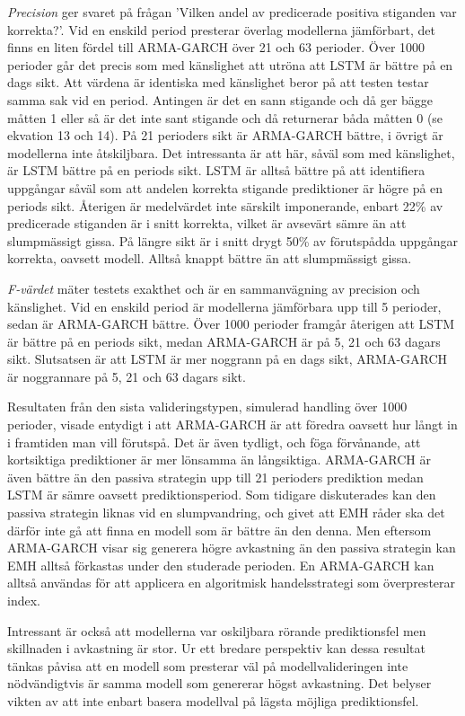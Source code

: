 \documentclass[11pt]{article}
\begin{document}
\textit{Precision} ger svaret på frågan 'Vilken andel av predicerade positiva stiganden var korrekta?'. Vid en enskild period presterar överlag modellerna jämförbart, det finns en liten fördel till ARMA-GARCH över 21 och 63 perioder. Över 1000 perioder går det precis som med känslighet att utröna att LSTM är bättre på en dags sikt. Att värdena är identiska med känslighet beror på att testen testar samma sak vid en period. Antingen är det en sann stigande och då ger bägge måtten 1 eller så är det inte sant stigande och då returnerar båda måtten 0 (se ekvation 13 och 14). På 21 perioders sikt är ARMA-GARCH bättre, i övrigt är modellerna inte åtskiljbara. Det intressanta är att här, såväl som med känslighet, är LSTM bättre på en periods sikt. LSTM är alltså bättre på att identifiera uppgångar såväl som att andelen korrekta stigande prediktioner är högre på en periods sikt. Återigen är medelvärdet inte särskilt imponerande, enbart 22\% av predicerade stiganden är i snitt korrekta, vilket är avsevärt sämre än att slumpmässigt gissa. På längre sikt är i snitt drygt 50\% av förutspådda uppgångar korrekta, oavsett modell. Alltså knappt bättre än att slumpmässigt gissa. 

\textit{F-värdet} mäter testets exakthet och är en sammanvägning av precision och känslighet. Vid en enskild period är modellerna jämförbara upp till 5 perioder, sedan är ARMA-GARCH bättre. Över 1000 perioder framgår återigen att LSTM är bättre på en periods sikt, medan ARMA-GARCH är på 5, 21 och 63 dagars sikt. Slutsatsen är att LSTM är mer noggrann på en dags sikt, ARMA-GARCH är noggrannare på 5, 21 och 63 dagars sikt. 

Resultaten från den sista valideringstypen, simulerad handling över 1000 perioder, visade entydigt i att ARMA-GARCH är att föredra oavsett hur långt in i framtiden man vill förutspå. Det är även tydligt, och föga förvånande, att kortsiktiga prediktioner är mer lönsamma än långsiktiga. ARMA-GARCH är även bättre än den passiva strategin upp till 21 perioders prediktion medan LSTM är sämre oavsett prediktionsperiod. Som tidigare diskuterades kan den passiva strategin liknas vid en slumpvandring, och givet att EMH råder ska det därför inte gå att finna en modell som är bättre än den denna. Men eftersom ARMA-GARCH visar sig generera högre avkastning än den passiva strategin kan EMH alltså förkastas under den studerade perioden. En ARMA-GARCH kan alltså användas för att applicera en algoritmisk handelsstrategi som överpresterar index. 

Intressant är också att modellerna var oskiljbara rörande prediktionsfel men skillnaden i avkastning är stor. Ur ett bredare perspektiv kan dessa resultat tänkas påvisa att en modell som presterar väl på modellvalideringen inte nödvändigtvis är samma modell som genererar högst avkastning. Det belyser vikten av att inte enbart basera modellval på lägsta möjliga prediktionsfel. 
\end{document}
